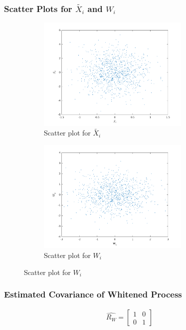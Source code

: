 \documentclass{article}
\begin{document}
		\subsubsection{Scatter Plots for $\tilde{X_{i}}$ and $W_{i}$}
			\begin{figure}[h]
				\begin{subfigure}{0.5\textwidth}
					\begin{center}
					\includegraphics[width=0.8\textwidth]{rvXtildaEsti.png}
					\caption{Scatter plot for $\tilde{X_{i}}$}
					\end{center}
				\end{subfigure}
				\begin{subfigure}{0.5\textwidth}
					\begin{center}
					\includegraphics[width=0.8\textwidth]{rvWEsti.png}
					\caption{Scatter plot for $W_{i}$}
					\end{center}
				\end{subfigure}
			\end{figure}
		\subsubsection{Estimated Covariance of Whitened Process}
			\begin{align*}
				\hat{R_{W}} =
				\begin{bmatrix}
					1 & 0 \\
					0 & 1
				\end{bmatrix}
			\end{align*}
\end{document}
